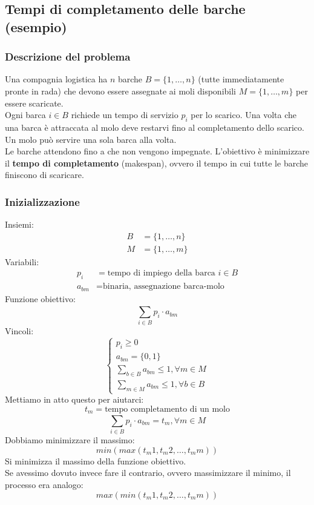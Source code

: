 \documentclass[12pt,a4paper]{article}
\begin{document}
\subsection{Tempi di completamento delle barche (esempio)}
\subsubsection{Descrizione del problema}
Una compagnia logistica ha $n$ barche $B = \{1,\ldots,n\}$ (tutte immediatamente pronte in rada) che devono essere assegnate ai moli disponibili $M = \{1,\ldots,m\}$ per essere scaricate.\\
Ogni barca $i \in B$ richiede un tempo di servizio $p_i$ per lo scarico. Una volta che una barca è attraccata al molo deve restarvi fino al completamento dello scarico. Un molo può servire una sola barca alla volta.\\
Le barche attendono fino a che non vengono impegnate. L'obiettivo è minimizzare il \textbf{tempo di completamento} (makespan), ovvero il tempo in cui tutte le barche finiscono di scaricare.
\subsubsection{Inizializzazione}
Insiemi:
\[
\begin{aligned}
    B &= \{1,\ldots,n\}\\
    M &= \{1,\ldots,m\}
\end{aligned}
\]
Variabili:
\[
\begin{aligned}
    p_i &= \text{tempo di impiego della barca } i \in B\\
    a_{bm} &= \text{binaria, assegnazione barca-molo}
\end{aligned}
\]
Funzione obiettivo:
\[
\sum_{i \in B}^{} p_i \cdot a_{bm}
\]
Vincoli:
\[
\begin{cases}
    p_i \geq 0\\
    a_{bm} = \{0,1\}\\
    \sum_{b \in B}^{} a_{bm} \leq 1, \forall m \in M\\
    \sum_{m \in M}^{} a_{bm} \leq 1, \forall b \in B
\end{cases}
\]
Mettiamo in atto questo per aiutarci:
\[
t_m = \text{tempo completamento di un molo}
\]
\[
\sum_{i \in B}^{} p_i \cdot a_{bm} = t_m, \forall m \in M
\]
Dobbiamo minimizzare il massimo:
\[
min(max(t_m1, t_m2, \ldots, t_mm))
\]
Si minimizza il massimo della funzione obiettivo.\\
Se avessimo dovuto invece fare il contrario, ovvero massimizzare il minimo, il processo era analogo:
\[
max(min(t_m1, t_m2, \ldots, t_mm))
\]
\end{document}
